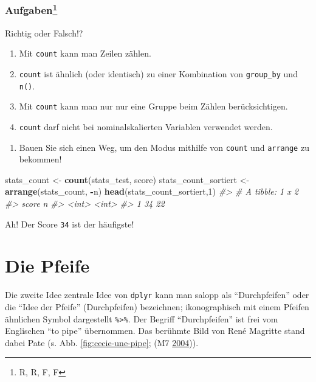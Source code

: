 \documentclass[12pt,ngerman,]{book}
\makeatletter
\newenvironment{Shaded}{\begin{snugshade}}{\end{snugshade}}
\newcommand{\KeywordTok}[1]{\textcolor[rgb]{0.13,0.29,0.53}{\textbf{#1}}}
\newcommand{\DecValTok}[1]{\textcolor[rgb]{0.00,0.00,0.81}{#1}}
\newcommand{\StringTok}[1]{\textcolor[rgb]{0.31,0.60,0.02}{#1}}
\newcommand{\CommentTok}[1]{\textcolor[rgb]{0.56,0.35,0.01}{\textit{#1}}}
\newcommand{\OperatorTok}[1]{\textcolor[rgb]{0.81,0.36,0.00}{\textbf{#1}}}
\newcommand{\NormalTok}[1]{#1}
\providecommand{\tightlist}{%
  \setlength{\itemsep}{0pt}\setlength{\parskip}{0pt}}
\let\rmarkdownfootnote\footnote%
\def\footnote{\protect\rmarkdownfootnote}
\newenvironment{kframe}{%
\medskip{}
\setlength{\fboxsep}{.8em}
 \def\at@end@of@kframe{}%
 \ifinner\ifhmode%
  \def\at@end@of@kframe{\end{minipage}}%
  \begin{minipage}{\columnwidth}%
 \fi\fi%
 \def\FrameCommand##1{\hskip\@totalleftmargin \hskip-\fboxsep
 \colorbox{shadecolor}{##1}\hskip-\fboxsep
     \hskip-\linewidth \hskip-\@totalleftmargin \hskip\columnwidth}%
 \MakeFramed {\advance\hsize-\width
   \@totalleftmargin\z@ \linewidth\hsize
   \@setminipage}}%
 {\par\unskip\endMakeFramed%
 \at@end@of@kframe}
\renewenvironment{Shaded}{\begin{kframe}}{\end{kframe}}
\theoremstyle{definition}
\theoremstyle{definition}
\theoremstyle{remark}
\let\BeginKnitrBlock\begin \let\EndKnitrBlock\end
\makeatother
\begin{document}
\subsubsection[Aufgaben]{\texorpdfstring{Aufgaben\footnote{R, R, F, F}}{Aufgaben}}\label{aufgaben-7}

\BeginKnitrBlock{rmdexercises}
Richtig oder Falsch!?

\begin{enumerate}
\def\labelenumi{\arabic{enumi}.}
\tightlist
\item
  Mit \texttt{count} kann man Zeilen zählen.
\item
  \texttt{count} ist ähnlich (oder identisch) zu einer Kombination von
  \texttt{group\_by} und \texttt{n()}.
\item
  Mit \texttt{count} kann man nur nur eine Gruppe beim Zählen
  berücksichtigen.
\item
  \texttt{count} darf nicht bei nominalskalierten Variablen verwendet
  werden.
\end{enumerate}
\EndKnitrBlock{rmdexercises}

\begin{enumerate}
\def\labelenumi{\arabic{enumi}.}
\tightlist
\item
  Bauen Sie sich einen Weg, um den Modus mithilfe von \texttt{count} und
  \texttt{arrange} zu bekommen!
\end{enumerate}

\begin{Shaded}
\begin{Highlighting}[]
\NormalTok{stats_count <-}\StringTok{ }\KeywordTok{count}\NormalTok{(stats_test, score)}
\NormalTok{stats_count_sortiert <-}\StringTok{ }\KeywordTok{arrange}\NormalTok{(stats_count, }\OperatorTok{-}\NormalTok{n)}
\KeywordTok{head}\NormalTok{(stats_count_sortiert,}\DecValTok{1}\NormalTok{)}
\CommentTok{#> # A tibble: 1 x 2}
\CommentTok{#>   score     n}
\CommentTok{#>   <int> <int>}
\CommentTok{#> 1    34    22}
\end{Highlighting}
\end{Shaded}

Ah! Der Score \texttt{34} ist der häufigste!

\section{Die Pfeife}\label{die-pfeife}

Die zweite Idee zentrale Idee von \texttt{dplyr} kann man salopp als
``Durchpfeifen'' oder die ``Idee der Pfeife''
(Durchpfeifen) bezeichnen; ikonographisch mit einem
Pfeifen ähnlichen Symbol dargestellt \texttt{\%\textgreater{}\%}. Der
Begriff ``Durchpfeifen'' ist frei vom Englischen ``to pipe'' übernommen.
Das berühmte Bild von René Magritte stand dabei Pate (s. Abb.
\ref{fig:cecie-une-pipe}; (M7
\protect\hyperlink{ref-m7_savinellis_2004}{2004})).
\end{document}
